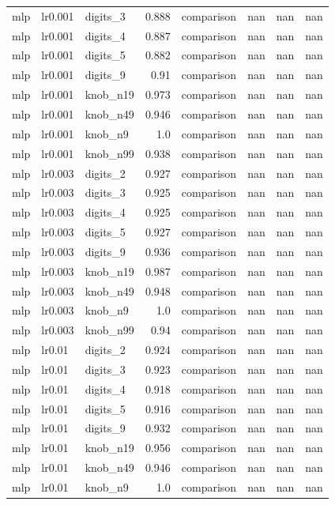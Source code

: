 \begin{table}[t]
\begin{tabular}{lllrrrrr}
mlp & lr0.001 & digits\_3 & 0.888 & comparison & nan & nan & nan \\
mlp & lr0.001 & digits\_4 & 0.887 & comparison & nan & nan & nan \\
mlp & lr0.001 & digits\_5 & 0.882 & comparison & nan & nan & nan \\
mlp & lr0.001 & digits\_9 & 0.91 & comparison & nan & nan & nan \\
mlp & lr0.001 & knob\_n19 & 0.973 & comparison & nan & nan & nan \\
mlp & lr0.001 & knob\_n49 & 0.946 & comparison & nan & nan & nan \\
mlp & lr0.001 & knob\_n9 & 1.0 & comparison & nan & nan & nan \\
mlp & lr0.001 & knob\_n99 & 0.938 & comparison & nan & nan & nan \\
mlp & lr0.003 & digits\_2 & 0.927 & comparison & nan & nan & nan \\
mlp & lr0.003 & digits\_3 & 0.925 & comparison & nan & nan & nan \\
mlp & lr0.003 & digits\_4 & 0.925 & comparison & nan & nan & nan \\
mlp & lr0.003 & digits\_5 & 0.927 & comparison & nan & nan & nan \\
mlp & lr0.003 & digits\_9 & 0.936 & comparison & nan & nan & nan \\
mlp & lr0.003 & knob\_n19 & 0.987 & comparison & nan & nan & nan \\
mlp & lr0.003 & knob\_n49 & 0.948 & comparison & nan & nan & nan \\
mlp & lr0.003 & knob\_n9 & 1.0 & comparison & nan & nan & nan \\
mlp & lr0.003 & knob\_n99 & 0.94 & comparison & nan & nan & nan \\
mlp & lr0.01 & digits\_2 & 0.924 & comparison & nan & nan & nan \\
mlp & lr0.01 & digits\_3 & 0.923 & comparison & nan & nan & nan \\
mlp & lr0.01 & digits\_4 & 0.918 & comparison & nan & nan & nan \\
mlp & lr0.01 & digits\_5 & 0.916 & comparison & nan & nan & nan \\
mlp & lr0.01 & digits\_9 & 0.932 & comparison & nan & nan & nan \\
mlp & lr0.01 & knob\_n19 & 0.956 & comparison & nan & nan & nan \\
mlp & lr0.01 & knob\_n49 & 0.946 & comparison & nan & nan & nan \\
mlp & lr0.01 & knob\_n9 & 1.0 & comparison & nan & nan & nan \\

\end{tabular}
\end{table}
